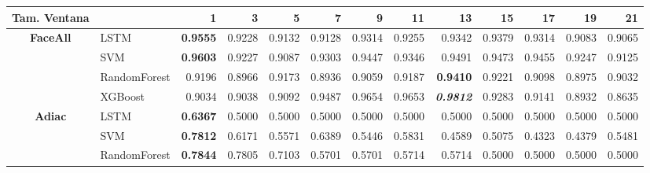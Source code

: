 \begin{table}[H]
	\centering
	\begin{adjustbox}{max width=14cm}
		\begin{tabular}{|c|l|r|r|r|r|r|r|r|r|r|r|r|}
			\hline
			\textbf{Tam. Ventana} &              & 1                        & 3                        & 5               & 7      & 9               & 11                       & 13                       & 15                       & 17     & 19                       & 21              \\
			\hline
			\textbf{FaceAll}      & LSTM         & \textbf{0.9555}          & 0.9228                   & 0.9132          & 0.9128 & 0.9314          & 0.9255                   & 0.9342                   & 0.9379                   & 0.9314 & 0.9083                   & 0.9065          \\
			                      & SVM          & \textbf{0.9603}          & 0.9227                   & 0.9087          & 0.9303 & 0.9447          & 0.9346                   & 0.9491                   & 0.9473                   & 0.9455 & 0.9247                   & 0.9125          \\
			                      & RandomForest & 0.9196                   & 0.8966                   & 0.9173          & 0.8936 & 0.9059          & 0.9187                   & \textbf{0.9410}          & 0.9221                   & 0.9098 & 0.8975                   & 0.9032          \\
			                      & XGBoost      & 0.9034                   & 0.9038                   & 0.9092          & 0.9487 & 0.9654          & 0.9653                   & \textit{\textbf{0.9812}} & 0.9283                   & 0.9141 & 0.8932                   & 0.8635          \\
			\hline
			\textbf{Adiac}        & LSTM         & \textbf{0.6367}          & 0.5000                   & 0.5000          & 0.5000 & 0.5000          & 0.5000                   & 0.5000                   & 0.5000                   & 0.5000 & 0.5000                   & 0.5000          \\
			                      & SVM          & \textbf{0.7812}          & 0.6171                   & 0.5571          & 0.6389 & 0.5446          & 0.5831                   & 0.4589                   & 0.5075                   & 0.4323 & 0.4379                   & 0.5481          \\
			                      & RandomForest & \textbf{0.7844}          & 0.7805                   & 0.7103          & 0.5701 & 0.5701          & 0.5714                   & 0.5714                   & 0.5000                   & 0.5000 & 0.5000                   & 0.5000          \\

\end{tabular}
\end{adjustbox}
\end{table}
